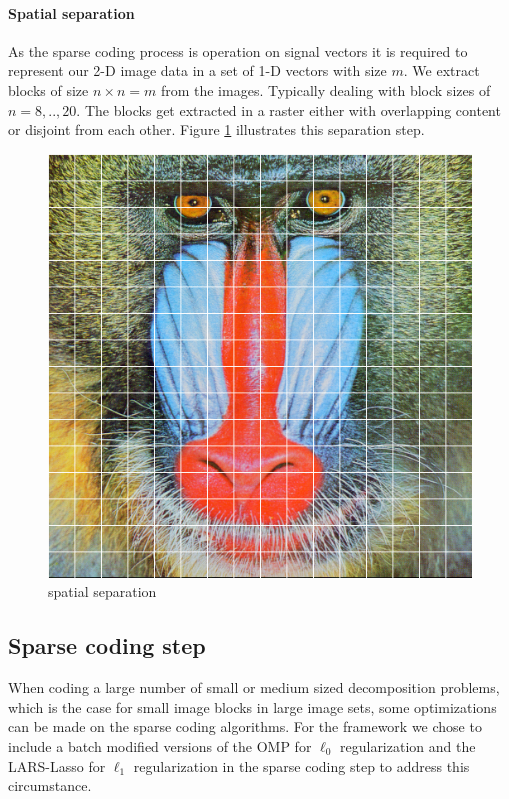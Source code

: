\paragraph{Spatial separation}
As the sparse coding process is operation on signal vectors it is required to
represent our 2-D image data in a set of 1-D vectors with size $m$. We extract
blocks of size $n \times n=m$ from the images. Typically dealing with block
sizes of $n=8,..,20$. The blocks get extracted in a raster either with
overlapping content or disjoint from each other. Figure \ref{fig:separation}
illustrates this separation step.
\begin{figure}[h]
\centering
\includegraphics[scale = 0.25]{images/segmentation.png}
\caption{spatial separation}
\label{fig:separation}
\end{figure}

\subsection{Sparse coding step}
When coding a large number of small or medium sized decomposition problems,
which is the case for small image blocks in large image sets, some
optimizations can be made on the sparse coding algorithms. 
For the framework we chose to include a batch modified versions of the OMP for
$\ell_0$ regularization and the LARS-Lasso for $\ell_1$ regularization in the
sparse coding step to address this circumstance. 

